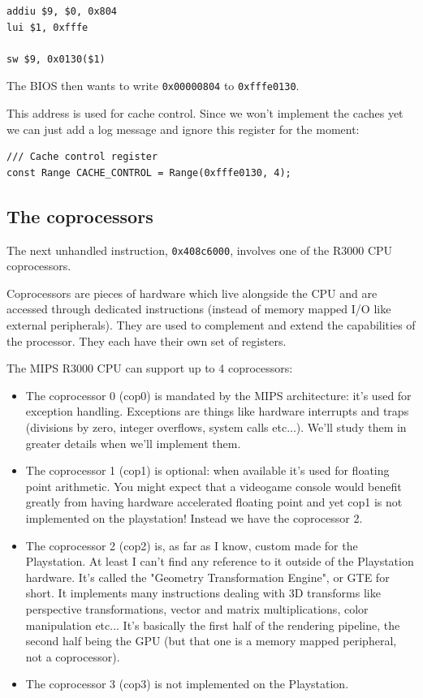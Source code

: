 \documentclass[a4paper]{article}
\newcommand{\code}[1] {\texttt{#1}}
\begin{document}
\begin{lstlisting}[language=assembly]
addiu $9, $0, 0x804
lui $1, 0xfffe

sw $9, 0x0130($1)
\end{lstlisting}
The BIOS then wants to write \code{0x00000804} to
\code{0xfffe0130}.

This address is used for cache control. Since we
won't implement the caches yet we can just add a log message and
ignore this register for the moment:

\begin{lstlisting}
/// Cache control register
const Range CACHE_CONTROL = Range(0xfffe0130, 4);
\end{lstlisting}

\subsection{The coprocessors}

The next unhandled instruction, \code{0x408c6000}, involves one of
the R3000 CPU coprocessors.

Coprocessors are pieces of hardware which live alongside the CPU and
are accessed through dedicated instructions (instead of memory mapped
I/O like external peripherals). They are used to complement and extend
the capabilities of the processor. They each have their own set of
registers.

The MIPS R3000 CPU can support up to 4 coprocessors:

\begin{itemize}
\item The coprocessor 0 (cop0) is mandated by the MIPS architecture:
  it's used for exception handling. Exceptions are things like
  hardware interrupts and traps (divisions by zero, integer overflows,
  system calls etc...). We'll study them in greater details when we'll
  implement them.

\item The coprocessor 1 (cop1) is optional: when available it's used for
  floating point arithmetic. You might expect that a videogame console
  would benefit greatly from having hardware accelerated floating point
  and yet cop1 is not implemented on the playstation! Instead we have
  the coprocessor 2.

\item The coprocessor 2 (cop2) is, as far as I know, custom made for
  the Playstation. At least I can't find any reference to it outside
  of the Playstation hardware. It's called the "Geometry
  Transformation Engine", or GTE for short. It implements many
  instructions dealing with 3D transforms like perspective
  transformations, vector and matrix multiplications, color
  manipulation etc... It's basically the first half of the rendering
  pipeline, the second half being the GPU (but that one is a memory
  mapped peripheral, not a coprocessor).

\item The coprocessor 3 (cop3) is not implemented on the Playstation.
\end{itemize}
\end{document}
